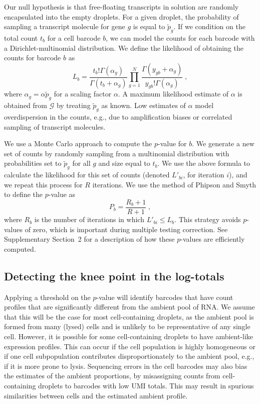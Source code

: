 \documentclass[10pt,letterpaper]{article}
\newcommand{\suppsecmontecarlo}{2}
\begin{document}
Our null hypothesis is that free-floating transcripts in solution are randomly encapsulated into the empty droplets.
For a given droplet, the probability of sampling a transcript molecule for gene $g$ is equal to $\tilde{p}_g$.
If we condition on the total count $t_b$ for a cell barcode $b$, we can model the counts for each barcode with a Dirichlet-multinomial distribution.
We define the likelihood of obtaining the counts for barcode $b$ as 
\[
    L_b = \frac{t_b!\Gamma(\alpha_g)}{\Gamma(t_b + \alpha_g)} \prod_{g=1}^N \frac{\Gamma(y_{gb}+\alpha_g)}{y_{gb}!\Gamma(\alpha_g)} \;,
\]
where $\alpha_g = \alpha\tilde{p}_g$ for a scaling factor $\alpha$.
A maximum likelihood estimate of $\alpha$ is obtained from $\mathcal{G}$ by treating $\tilde{p}_g$ as known.
Low estimates of $\alpha$ model overdispersion in the counts, e.g., due to amplification biases or correlated sampling of transcript molecules.

We use a Monte Carlo approach to compute the $p$-value for $b$.
We generate a new set of counts by randomly sampling from a multinomial distribution with probabilities set to $\tilde{p}_g$ for all $g$ and size equal to $t_b$.
We use the above formula to calculate the likelihood for this set of counts (denoted $L'_{bi}$, for iteration $i$), and we repeat this process for $R$ iterations. 
We use the method of Phipson and Smyth \cite{phipson2010permutation} to define the $p$-value as 
\[
    P_b = \frac{R_b +1 }{R + 1} \;,
\]
where $R_b$ is the number of iterations in which $L'_{bi} \le L_b$.
This strategy avoids $p$-values of zero, which is important during multiple testing correction.
See Supplementary Section~\suppsecmontecarlo{} for a description of how these $p$-values are efficiently computed.

\subsection*{Detecting the knee point in the log-totals}
Applying a threshold on the $p$-value will identify barcodes that have count profiles that are significantly different from the ambient pool of RNA.
We assume that this will be the case for most cell-containing droplets, as the ambient pool is formed from many (lysed) cells and is unlikely to be representative of any single cell.
However, it is possible for some cell-containing droplets to have ambient-like expression profiles.
This can occur if the cell population is highly homogeneous or if one cell subpopulation contributes disproportionately to the ambient pool, e.g., if it is more prone to lysis.
Sequencing errors in the cell barcodes may also bias the estimates of the ambient proportions, by misassigning counts from cell-containing droplets to barcodes with low UMI totals.
This may result in spurious similarities between cells and the estimated ambient profile.
\end{document}
